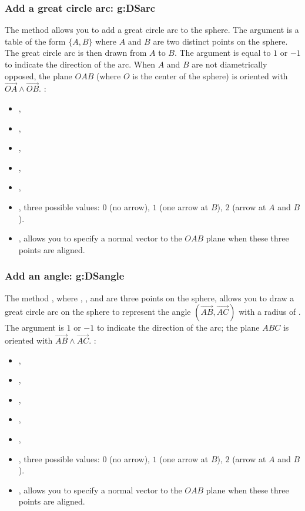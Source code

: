 \subsubsection{Add a great circle arc: g:DSarc}

The method  allows you to add a great circle arc to the sphere. The argument  is a table of the form $\{A,B\}$ where $A$ and $B$ are two distinct points on the sphere. The great circle arc is then drawn from $A$ to $B$. The argument  is equal to $1$ or $-1$ to indicate the direction of the arc. When $A$ and $B$ are not diametrically opposed, the plane $OAB$ (where $O$ is the center of the sphere) is oriented with $\vec{OA}\wedge\vec{OB}$. \writeoptions:
\begin{itemize}
    \item {},
    \item {},
    \item {},
    \item {},
    \item {},
    \item {}, three possible values: $0$ (no arrow), $1$ (one arrow at $B$), $2$ (arrow at $A$ and $B$).
    \item {}, allows you to specify a normal vector to the $OAB$ plane when these three points are aligned.
\end{itemize}

\subsubsection{Add an angle: g:DSangle}

The method , where , , and  are three points on the sphere, allows you to draw a great circle arc on the sphere to represent the angle $(\vec{AB},\vec{AC})$ with a radius of . The argument  is $1$ or $-1$ to indicate the direction of the arc; the plane $ABC$ is oriented with $\vec{AB}\wedge\vec{AC}$. \writeoptions:
\begin{itemize}
    \item {},
    \item {},
    \item {},
    \item {},
    \item {},
    \item {}, three possible values: $0$ (no arrow), $1$ (one arrow at $B$), $2$ (arrow at $A$ and $B$).
    \item {}, allows you to specify a normal vector to the $OAB$ plane when these three points are aligned.
\end{itemize}

